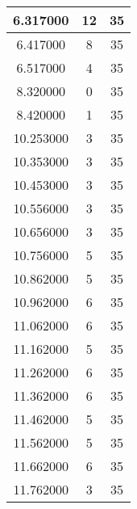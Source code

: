 \begin{longtable}[htbp]{|c|c|c|}
6.317000 & 12 & 35 \\ \hline
6.417000 & 8 & 35 \\ \hline
6.517000 & 4 & 35 \\ \hline
8.320000 & 0 & 35 \\ \hline
8.420000 & 1 & 35 \\ \hline
10.253000 & 3 & 35 \\ \hline
10.353000 & 3 & 35 \\ \hline
10.453000 & 3 & 35 \\ \hline
10.556000 & 3 & 35 \\ \hline
10.656000 & 3 & 35 \\ \hline
10.756000 & 5 & 35 \\ \hline
10.862000 & 5 & 35 \\ \hline
10.962000 & 6 & 35 \\ \hline
11.062000 & 6 & 35 \\ \hline
11.162000 & 5 & 35 \\ \hline
11.262000 & 6 & 35 \\ \hline
11.362000 & 6 & 35 \\ \hline
11.462000 & 5 & 35 \\ \hline
11.562000 & 5 & 35 \\ \hline
11.662000 & 6 & 35 \\ \hline
11.762000 & 3 & 35 \\ \hline
\end{longtable}

